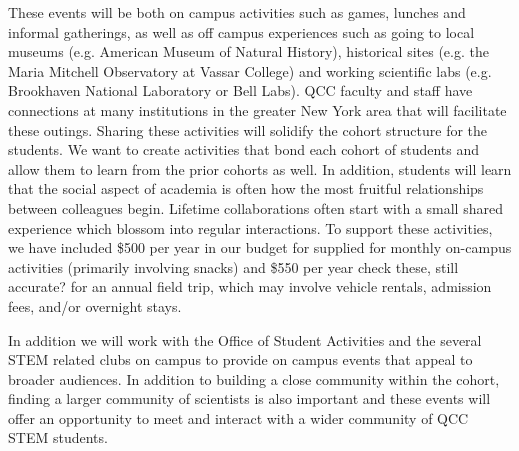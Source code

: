 \documentclass[12pt]{article}
\newcommand\new[1]{{\color{blue}#1}}
\begin{document}
These events will be both on campus activities such as games, lunches and informal gatherings, as well as off campus experiences such as going to local museums (e.g. American Museum of Natural History), historical sites (e.g. the Maria Mitchell Observatory at Vassar College) and working scientific labs (e.g. Brookhaven National Laboratory or Bell Labs). QCC faculty and staff have connections at many institutions in the greater New York area that will facilitate these outings.  Sharing these activities will solidify the cohort structure for the students.  We want to create activities that bond each cohort of students and allow them to learn from the prior cohorts as well.  In addition, students will learn that the social aspect of academia is often how the most fruitful relationships between colleagues begin.  Lifetime collaborations often start with a small shared experience which blossom into regular interactions.  To support these activities, we have included \$500 per year in our budget for supplied for monthly on-campus activities (primarily involving snacks) and \$550 per year \new{check these, still accurate?} for an annual field trip, which may involve vehicle rentals, admission fees, and/or overnight stays.

In addition we will work with the Office of Student Activities and the several STEM related clubs on campus to provide on campus events that appeal to broader audiences.  In addition to building a close community within the cohort, finding a larger community of scientists is also important and these events will offer an opportunity to meet and interact with a wider community of QCC STEM students. 



\end{document}
